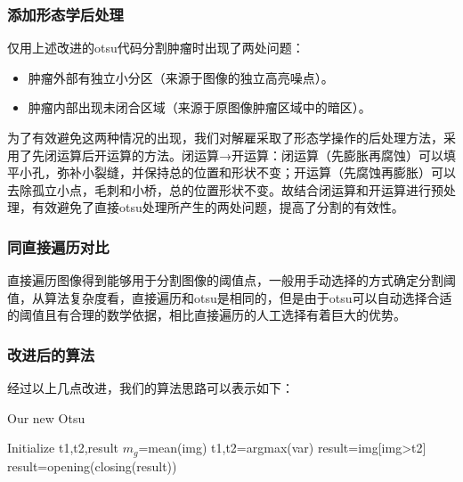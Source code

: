 \documentclass[UTF8]{ctexart}
\begin{document}
\subsubsection*{添加形态学后处理}
仅用上述改进的otsu代码分割肿瘤时出现了两处问题：
\begin{itemize}
    \item 肿瘤外部有独立小分区（来源于图像的独立高亮噪点）。
    \item 肿瘤内部出现未闭合区域（来源于原图像肿瘤区域中的暗区）。
\end{itemize}

为了有效避免这两种情况的出现，我们对解雇采取了形态学操作的后处理方法，采用了先闭运算后开运算的方法。闭运算→开运算：闭运算（先膨胀再腐蚀）可以填平小孔，弥补小裂缝，并保持总的位置和形状不变；开运算（先腐蚀再膨胀）可以去除孤立小点，毛刺和小桥，总的位置形状不变。故结合闭运算和开运算进行预处理，有效避免了直接otsu处理所产生的两处问题，提高了分割的有效性。

\subsubsection*{同直接遍历对比}

直接遍历图像得到能够用于分割图像的阈值点，一般用手动选择的方式确定分割阈值，从算法复杂度看，直接遍历和otsu是相同的，但是由于otsu可以自动选择合适的阈值且有合理的数学依据，相比直接遍历的人工选择有着巨大的优势。

\subsubsection*{改进后的算法}
经过以上几点改进，我们的算法思路可以表示如下：

\begin{algorithm}[H]
    \caption{Our new Otsu}\label{algorithm}
        Initialize t1,t2,result\;
        $m_g$=mean(img)\;
        t1,t2=argmax(var)\;
        result=img[img>t2]\;
        result=opening(closing(result))\;
        
        
\end{algorithm}
\end{document}
